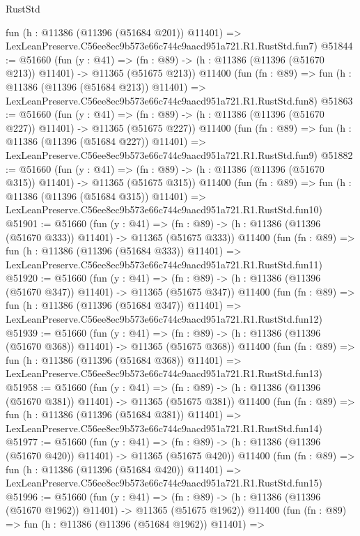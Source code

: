 \begin{lexlean}{RustStd}
\begin{coremodule}
    fun (h : @11386 (@11396 (@51684 @201)) @11401) =>
    LexLeanPreserve.C56ee8ec9b573e66c744c9aacd951a721.R1.RustStd.fun7)
@51844 := @51660
    (fun (y : @41) =>
    (fn : @89) -> (h : @11386 (@11396 (@51670 @213)) @11401) -> @11365 (@51675 @213))
    @11400
    (fun (fn : @89) =>
    fun (h : @11386 (@11396 (@51684 @213)) @11401) =>
    LexLeanPreserve.C56ee8ec9b573e66c744c9aacd951a721.R1.RustStd.fun8)
@51863 := @51660
    (fun (y : @41) =>
    (fn : @89) -> (h : @11386 (@11396 (@51670 @227)) @11401) -> @11365 (@51675 @227))
    @11400
    (fun (fn : @89) =>
    fun (h : @11386 (@11396 (@51684 @227)) @11401) =>
    LexLeanPreserve.C56ee8ec9b573e66c744c9aacd951a721.R1.RustStd.fun9)
@51882 := @51660
    (fun (y : @41) =>
    (fn : @89) -> (h : @11386 (@11396 (@51670 @315)) @11401) -> @11365 (@51675 @315))
    @11400
    (fun (fn : @89) =>
    fun (h : @11386 (@11396 (@51684 @315)) @11401) =>
    LexLeanPreserve.C56ee8ec9b573e66c744c9aacd951a721.R1.RustStd.fun10)
@51901 := @51660
    (fun (y : @41) =>
    (fn : @89) -> (h : @11386 (@11396 (@51670 @333)) @11401) -> @11365 (@51675 @333))
    @11400
    (fun (fn : @89) =>
    fun (h : @11386 (@11396 (@51684 @333)) @11401) =>
    LexLeanPreserve.C56ee8ec9b573e66c744c9aacd951a721.R1.RustStd.fun11)
@51920 := @51660
    (fun (y : @41) =>
    (fn : @89) -> (h : @11386 (@11396 (@51670 @347)) @11401) -> @11365 (@51675 @347))
    @11400
    (fun (fn : @89) =>
    fun (h : @11386 (@11396 (@51684 @347)) @11401) =>
    LexLeanPreserve.C56ee8ec9b573e66c744c9aacd951a721.R1.RustStd.fun12)
@51939 := @51660
    (fun (y : @41) =>
    (fn : @89) -> (h : @11386 (@11396 (@51670 @368)) @11401) -> @11365 (@51675 @368))
    @11400
    (fun (fn : @89) =>
    fun (h : @11386 (@11396 (@51684 @368)) @11401) =>
    LexLeanPreserve.C56ee8ec9b573e66c744c9aacd951a721.R1.RustStd.fun13)
@51958 := @51660
    (fun (y : @41) =>
    (fn : @89) -> (h : @11386 (@11396 (@51670 @381)) @11401) -> @11365 (@51675 @381))
    @11400
    (fun (fn : @89) =>
    fun (h : @11386 (@11396 (@51684 @381)) @11401) =>
    LexLeanPreserve.C56ee8ec9b573e66c744c9aacd951a721.R1.RustStd.fun14)
@51977 := @51660
    (fun (y : @41) =>
    (fn : @89) -> (h : @11386 (@11396 (@51670 @420)) @11401) -> @11365 (@51675 @420))
    @11400
    (fun (fn : @89) =>
    fun (h : @11386 (@11396 (@51684 @420)) @11401) =>
    LexLeanPreserve.C56ee8ec9b573e66c744c9aacd951a721.R1.RustStd.fun15)
@51996 := @51660
    (fun (y : @41) =>
    (fn : @89) -> (h : @11386 (@11396 (@51670 @1962)) @11401) -> @11365 (@51675 @1962))
    @11400
    (fun (fn : @89) =>
    fun (h : @11386 (@11396 (@51684 @1962)) @11401) =>

\end{coremodule}
\end{lexlean}
